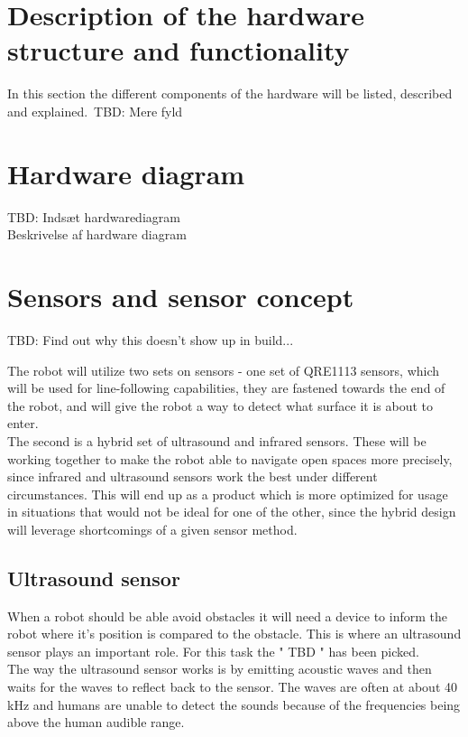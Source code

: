\section{Description of the hardware structure and functionality}

In this section the different components of the hardware will be listed, described and explained.\
TBD: Mere fyld

\section{Hardware diagram}

TBD: Indsæt hardwarediagram\\
Beskrivelse af hardware diagram\\

\section{Sensors and sensor concept}

TBD: Find out why this doesn't show up in build...

The robot will utilize two sets on sensors - one set of QRE1113 sensors, which will be used for line-following capabilities, they are fastened towards the end of the robot, and will give the robot a way to detect what surface it is about to enter.\\
The second is a hybrid set of ultrasound and infrared sensors. These will be working together to make the robot able to navigate open spaces more precisely, since infrared and ultrasound sensors work the best under different circumstances. This will end up as a product which is more optimized for usage in situations that would not be ideal for one of the other, since the hybrid design will leverage shortcomings of a given sensor method.\\

\subsection{Ultrasound sensor}
When a robot should be able avoid obstacles it will need a device to inform the robot where it's position is compared to the obstacle. This is where an ultrasound sensor plays an important role. For this task the " TBD " has been picked.\\

The way the ultrasound sensor works is by emitting acoustic waves and then waits for the waves to reflect back to the sensor. The waves are often at about 40 kHz and humans are unable to detect the sounds because of the frequencies being above the human audible range.\

